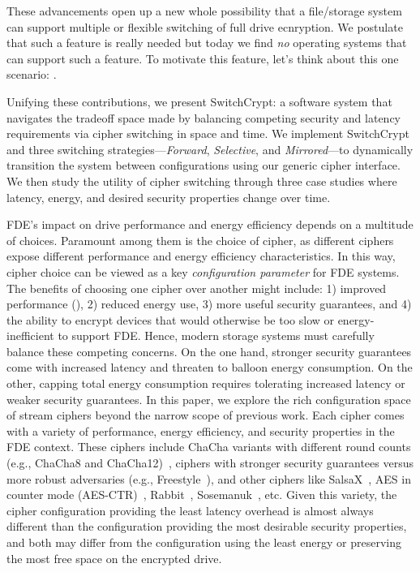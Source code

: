 These advancements open up a new whole possibility that a file/storage system
can support multiple or flexible switching of full drive ecnryption.
We postulate that such a feature is really needed but today we find {\em no}
operating systems that can support such a feature.
To motivate this feature, let's think about this one scenario:
.





Unifying these contributions, we present SwitchCrypt: a software system that
navigates the tradeoff space made by balancing competing security and latency
requirements via cipher switching in space and time. We implement SwitchCrypt
and three switching strategies---\emph{Forward}, \emph{Selective}, and
\emph{Mirrored}---to dynamically transition the system between configurations
using our generic cipher interface. We then study the utility of cipher
switching through three case studies where latency, energy, and desired security
properties change over time.


FDE's impact on drive performance and energy efficiency depends on a multitude
of choices. Paramount among them is the choice of cipher, as different ciphers
expose different performance and energy efficiency characteristics. In this way,
cipher choice can be viewed as a key \emph{configuration parameter} for FDE
systems. The benefits of choosing one cipher over another might include: 1)
improved performance (), 2) reduced energy
use, 3) more useful security guarantees, and 4) the ability to encrypt devices
that would otherwise be too slow or energy-inefficient to support FDE.
Hence, modern storage systems
must carefully balance these competing concerns. On the one hand, stronger
security guarantees come with increased latency and threaten to balloon energy
consumption. On the other, capping total energy consumption requires tolerating
increased latency or weaker security guarantees.
In this paper, we explore the rich configuration space of stream ciphers beyond
the narrow scope of previous work. Each cipher comes with a variety of
performance, energy efficiency, and security properties in the FDE context.
These ciphers include ChaCha variants with different round counts (e.g.,
ChaCha8 and ChaCha12)~\cite{ChaCha20}, ciphers with stronger security
guarantees versus more robust adversaries (e.g., Freestyle~\cite{Freestyle}),
and other ciphers like SalsaX~\cite{SalsaX}, AES in counter mode
(AES-CTR)~\cite{AESCTR}, Rabbit~\cite{Rabbit}, Sosemanuk~\cite{Sosemanuk}, etc.
Given this variety, the cipher configuration providing the least latency
overhead is almost always different than the configuration providing the most
desirable security properties, and both may differ from the configuration using
the least energy or preserving the most free space on the encrypted drive.


